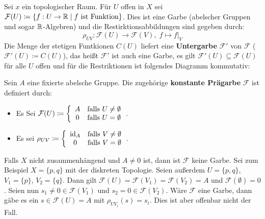 \begin{bsp}
\label{bsp:1.5}
	Sei $x$ ein topologischer Raum. Für $U$ offen in $X$ sei $\mathcal{F}(U)\coloneqq \{f:U\to \mathbb {R} \mid f \text{ ist Funktion}\}$. Dies ist eine Garbe (abelscher Gruppen und sogar $\mathbb {R}$-Algebren) und die Restirktionsabbildungen sind gegeben durch:
	\[
		\rho_{UV}:\mathcal{F}(U) \to \mathcal{F}(V),\; f \mapsto f\vert_V
	\]
	Die Menge der stetigen Funtkionen $C(U)$ liefert eine \textbf{Untergarbe} $\mathcal{F}'$ von $\mathcal{F}$ ($\mathcal{F}'(U)\coloneqq C(U)$), das heißt $\mathcal{F}'$ ist auch eine Garbe, es gilt $\mathcal{F}'(U)\subseteq \mathcal{F}(U)$ für alle $U$ offen und für die Restriktionen ist folgendes Diagramm kommutativ:
	\begin{center}
	\end{center}

\end{bsp}

\begin{bsp}
	Sein $A$ eine fixierte abelsche Gruppe. Die zugehörige \textbf{konstante Prägarbe} $\mathcal{F}$ ist definiert durch:
	\begin{itemize}
		\item Es Sei $\mathcal{F}(U) \coloneqq \left\lbrace \begin{array}{c c}A & \text{falls } U \neq \emptyset\\0& \text{falls } U = \emptyset\end{array}\right.$.
		\item Es sei $\rho_{UV} \coloneqq \left\lbrace \begin{array}{c c}\operatorname{id}_A & \text{falls } V \neq \emptyset\\0& \text{falls } V = \emptyset\end{array}\right.$.
	\end{itemize}
	Falls $X$ nicht zusammenhängend und $A \neq 0$ ist, dann ist $\mathcal{F}$ keine Garbe. Sei zum Beispiel $X=\{p,q\}$ mit der diskreten Topologie. Seien außerdem $U=\{p,q\}$, $V_1=\{p\}$, $V_2=\{q\}$. Dann gilt $\mathcal{F}(U)=\mathcal{F}(V_1)=\mathcal{F}(V_2) = A$ und $\mathcal{F}(\emptyset)=0$. Seien nun $s_1 \neq 0 \in \mathcal{F}(V_1)$ und $s_2 = 0 \in \mathcal{F}(V_2)$. Wäre $\mathcal{F}$ eine Garbe, dann gäbe es ein $s \in \mathcal{F}(U) = A$ mit $\rho_{UV_i}(s) = s_i$. Dies ist aber offenbar nicht der Fall.
\end{bsp}

